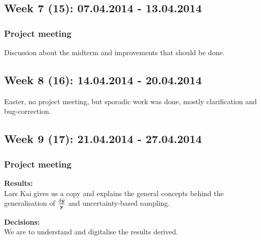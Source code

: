 \documentclass[11pt, a4paper]{article} %
\begin{document}
\subsection*{Week 7 (15): 07.04.2014 - 13.04.2014}
\subsubsection*{Project meeting}
Discussion about the midterm and improvements that should be done.








\subsection*{Week 8 (16): 14.04.2014 - 20.04.2014}
Easter, no project meeting, but sporadic work was done, mostly clarification and bug-correction.


\subsection*{Week 9 (17): 21.04.2014 - 27.04.2014}\subsubsection*{Project meeting}


\textbf{Results:}\\
Lars Kai gives us a copy and explains the general concepts behind the generalisation of $\frac{\delta \hat{{\bf y}}}{{\bf y}}$ and uncertainty-based sampling.

\textbf{Decisions:}\\
We are to understand and digitalise the results derived.
\end{document}
